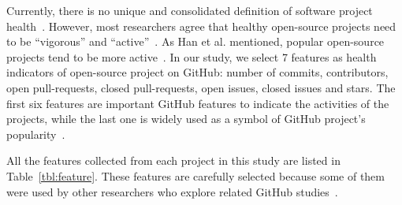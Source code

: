 \documentclass[sigconf,review,anonymous]{acmart}
\newcommand{\tbl}[1]{Table~\ref{tbl:#1}}
\begin{document}
Currently, there is no unique and consolidated definition of software project health~\cite{jansen2014measuring,liao2019healthy,link2018assessing}.
However,  most researchers agree that healthy open-source projects need to be ``vigorous'' and ``active''~\cite{wahyudin2007monitoring,jansen2014measuring,manikas2013reviewing,link2018assessing,wynn2007assessing,crowston2006assessing}. As Han et al. mentioned, popular open-source projects tend to be more active~\cite{han2019characterization}. In our study, we select 7 features as health indicators of open-source project on GitHub: number of commits, contributors, open pull-requests, closed pull-requests, open issues, closed issues and stars. The first six features are important GitHub features to indicate the activities of the projects, while the last one is widely used as a symbol of GitHub project's popularity~\cite{borges2016understanding,han2019characterization,aggarwal2014co}.

All the features collected from each project in this study 
are listed in  \tbl{feature}. These features are carefully selected because some of them were used by other researchers who explore related
GitHub studies~\cite{coelho2020github, yu2016reviewer, han2019characterization}.  







 
 



\end{document}
